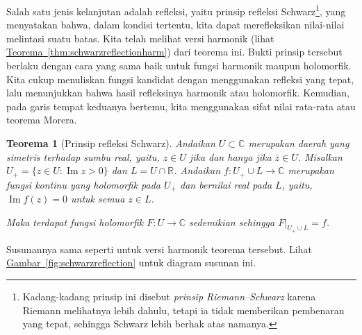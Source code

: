\documentclass[12pt,openany]{book}
\renewcommand{\Im}{\operatorname{Im}}
\newcommand{\C}{{\mathbb{C}}}
\newcommand{\R}{{\mathbb{R}}}
\newcommand{\myindex}[1]{#1\index{#1}}
\theoremstyle{plain}
\newtheorem{thm}{Teorema}[section]
\theoremstyle{remark}
\theoremstyle{definition}
\theoremstyle{exercise}
\theoremstyle{example}
\newcommand{\figureref}[1]{\hyperref[#1]{Gambar~\ref*{#1}}}
\newcommand{\thmref}[1]{\hyperref[#1]{Teorema~\ref*{#1}}}
\begin{document}
Salah satu jenis kelanjutan adalah refleksi, yaitu prinsip refleksi
Schwarz\footnote{Kadang-kadang prinsip ini disebut
\emph{\myindex{prinsip Riemann--Schwarz}} karena Riemann melihatnya lebih dahulu, tetapi ia 
tidak memberikan pembenaran yang tepat, sehingga Schwarz lebih berhak atas namanya.},
yang 
menyatakan bahwa, dalam kondisi tertentu, kita dapat merefleksikan nilai-nilai melintasi suatu batas.
Kita telah melihat versi harmonik (lihat \thmref{thm:schwarzreflectionharm})
dari teorema ini.
Bukti prinsip tersebut berlaku dengan cara yang sama baik untuk fungsi
harmonik maupun holomorfik.
Kita cukup menuliskan fungsi kandidat dengan menggunakan
refleksi yang tepat, lalu menunjukkan bahwa hasil refleksinya harmonik atau
holomorfik.  Kemudian, pada garis tempat keduanya bertemu, kita menggunakan
sifat nilai rata-rata atau teorema Morera.

\begin{thm}[Prinsip refleksi Schwarz]
\label{thm:schwarzreflectionholo}
Andaikan $U \subset \C$ merupakan daerah yang simetris terhadap sumbu real, yaitu,
$z \in U$ jika dan hanya jika $\bar{z} \in U$.
Misalkan $U_+ = \{ z \in U : \Im z > 0 \}$ dan $L = U \cap \R$.
Andaikan $f \colon U_+ \cup L \to \C$ merupakan fungsi kontinu yang
holomorfik pada $U_+$ dan bernilai real pada $L$, yaitu,
$\Im f(z) = 0$ untuk semua $z \in L$.

Maka terdapat fungsi holomorfik $F \colon U \to \C$ sedemikian sehingga
$F|_{U_+ \cup L} = f$.
\end{thm}

Susunannya sama seperti untuk versi harmonik teorema tersebut.
Lihat \figureref{fig:schwarzreflection} untuk diagram susunan ini.
\end{document}
